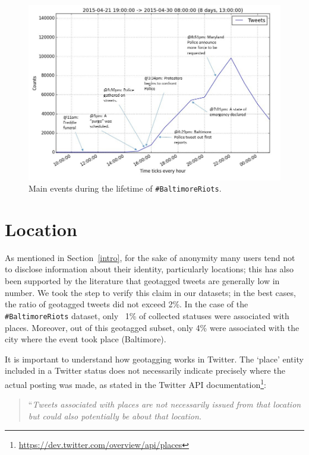 \documentclass[conference]{IEEEtran}
\begin{document}
\begin{figure}[!htb]
\centering
\includegraphics[width=\columnwidth]{images/mainevents.png}
\caption{Main events during the lifetime of {\texttt{\#BaltimoreRiots}}.}
\label{fig:mainevents}
\end{figure}


\section{Location}\label{location}

As mentioned in Section~\ref{intro}, for the sake of anonymity many
users tend not to disclose information about their identity,
particularly locations; this has also been supported by the literature
that geotagged tweets are generally low in number. We took the step to
verify this claim in our datasets; in the best cases, the ratio of
geotagged tweets did not exceed 2\%. In the case of the
{\texttt{\#BaltimoreRiots}} dataset, only ~1\% of collected statuses
were associated with places. Moreover, out of this geotagged subset,
only 4\% were associated with the city where the event took place
(Baltimore).

It is important to understand how geotagging works in Twitter. The
`place' entity included in a Twitter status does not necessarily
indicate precisely where the actual posting was made, as stated in the
Twitter API
documentation\footnote{\url{https://dev.twitter.com/overview/api/places}}:

\begin{quotation}
``{\emph{Tweets associated with places are not necessarily issued from that
location but could also potentially be about that location.}}
\end{quotation}
\end{document}
